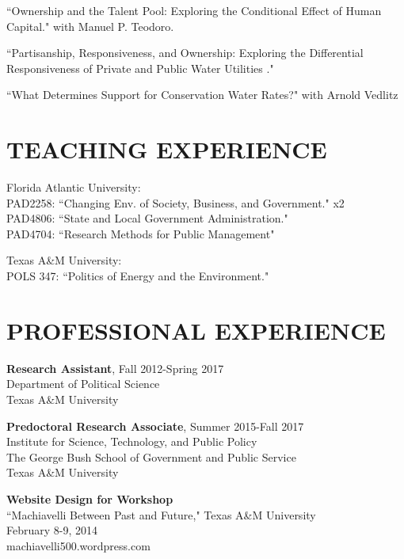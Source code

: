 \documentclass[margin]{res} %
\begin{document}
\begin{resume}
\begin{hangparas}{.25in}{1}
``Ownership and the Talent Pool: Exploring the Conditional Effect of Human Capital." with Manuel P. Teodoro.

``Partisanship, Responsiveness, and Ownership: Exploring the Differential Responsiveness of Private and Public Water Utilities ."

``What Determines Support for Conservation Water Rates?" with Arnold Vedlitz \end{hangparas}



\section{TEACHING EXPERIENCE}

 \begin{hangparas}{.25in}{1}  Florida Atlantic University: \\
 PAD2258: ``Changing Env. of Society, Business, and Government." x2 \\
 PAD4806: ``State and Local Government Administration."\\
 PAD4704: ``Research Methods for Public Management"
 
Texas A\&M University: \\
 POLS 347: ``Politics of Energy and the Environment."
 
 \end{hangparas}

\section{PROFESSIONAL EXPERIENCE}


\begin{hangparas}{.25in}{1} \textbf{Research Assistant}, Fall 2012-Spring 2017 \\
Department of Political Science \\
 Texas A\&M University

\textbf{Predoctoral Research Associate}, Summer 2015-Fall 2017 \\
Institute for Science, Technology, and Public Policy \\
The George Bush School of Government and Public Service \\
Texas A\&M University

\textbf{Website Design for Workshop} \\
``Machiavelli Between Past and Future," Texas A\&M University \\
February 8-9, 2014 \\
machiavelli500.wordpress.com


\end{hangparas}
\end{resume}
\end{document}
